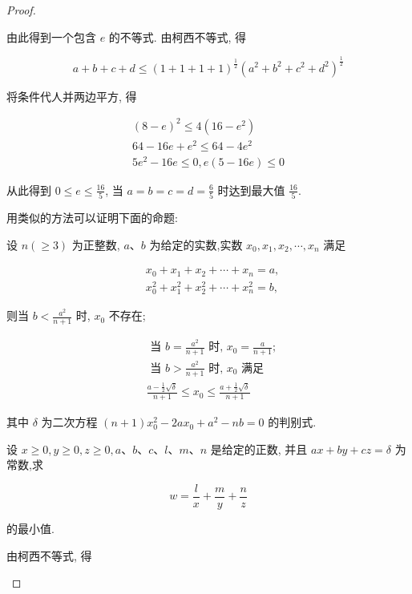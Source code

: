 \begin{proof}
\begin{example}
\begin{solution}
\begin{solution}
	由此得到一个包含 $e$ 的不等式. 由柯西不等式, 得
	
	$$
	a+b+c+d \leqslant(1+1+1+1)^{\frac{1}{2}}\left(a^{2}+b^{2}+c^{2}+d^{2}\right)^{\frac{1}{2}}
	$$
	
	将条件代人并两边平方, 得
	
	$$
	\begin{gathered}
	(8-e)^{2} \leqslant 4\left(16-e^{2}\right) \\
	64-16 e+e^{2} \leqslant 64-4 e^{2} \\
	5 e^{2}-16 e \leqslant 0, e(5-16 e) \leqslant 0
	\end{gathered}
	$$
	
	从此得到 $0 \leqslant e \leqslant \frac{16}{5}$, 当 $a=b=c=d=\frac{6}{5}$ 时达到最大值 $\frac{16}{5}$.
\end{solution}
\begin{note}
	用类似的方法可以证明下面的命题:
	
	设 $n(\geqslant 3)$ 为正整数, $a 、 b$ 为给定的实数,实数 $x_{0}, x_{1}, x_{2}, \cdots, x_{n}$ 满足
	
	$$
	\begin{aligned}
	& x_{0}+x_{1}+x_{2}+\cdots+x_{n}=a, \\
	& x_{0}^{2}+x_{1}^{2}+x_{2}^{2}+\cdots+x_{n}^{2}=b,
	\end{aligned}
	$$
	
	则当 $b<\frac{a^{2}}{n+1}$ 时, $x_{0}$ 不存在;
	
	$$
	\begin{aligned}
	& \text { 当 } b=\frac{a^{2}}{n+1} \text { 时, } x_{0}=\frac{a}{n+1} \text {; } \\
	& \text { 当 } b>\frac{a^{2}}{n+1} \text { 时, } x_{0} \text { 满足 } \\
	& \frac{a-\frac{1}{2} \sqrt{\delta}}{n+1} \leqslant x_{0} \leqslant \frac{a+\frac{1}{2} \sqrt{\delta}}{n+1}
	\end{aligned}
	$$
	
	其中 $\delta$ 为二次方程 $(n+1) x_{0}^{2}-2 a x_{0}+a^{2}-n b=0$ 的判别式.
\end{note}

\begin{example}
	设 $x \geqslant 0, y \geqslant 0, z \geqslant 0, a 、 b 、 c 、 l 、 m 、 n$ 是给定的正数, 并且 $a x+b y+c z=\delta$ 为常数,求
	
	$$
	w=\frac{l}{x}+\frac{m}{y}+\frac{n}{z}
	$$
	
	的最小值.
\end{example}
\begin{solution}
	由柯西不等式, 得
	

\end{solution}
\end{solution}
\end{example}
\end{proof}
